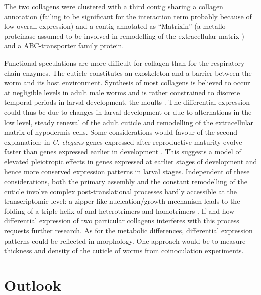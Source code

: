 \documentclass[10pt]{article}
\begin{document}
The two collagens were clustered with a third contig sharing a
collagen annotation (failing to be significant for the interaction
term probably because of low overall expression) and a contig
annotated as ``Matrixin'' (a metallo-proteinase assumed to be involved
in remodelling of the extracellular matrix \cite{mealloprot}) and a
ABC-transporter family protein.

Functional speculations are more difficult for collagen than for the
respiratory chain enzymes. The cuticle constitutes an exoskeleton and
a barrier between the worm and its host environment. Synthesis of most
collagens is believed to occur at negligible levels in adult male
worms and is rather constrained to discrete temporal periods in larval
development, the moults \cite{pmid10637627}. The differential
expression could thus be due to changes in larval development or due
to alternations in the low level, steady renewal of the adult cuticle
and remodelling of the extracellular matrix of hypodermis cells. Some
considerations would favour of the second explanation: in
\textit{C. elegans} genes expressed after reproductive maturity evolve
faster than genes expressed earlier in development
\cite{pmid15371532}. This suggests a model of elevated pleiotropic
effects in genes expressed at earlier stages of development and hence
more conserved expression patterns in larval stages. Independent of
these considerations, both the primary assembly and the constant
remodelling of the cuticle involve complex post-translational
processes hardly accessible at the transcriptomic level: a zipper-like
nucleation/growth mechanism leads to the folding of a triple helix of
and heterotrimers and homotrimers \cite{kennedy2001parasitic}. If and
how differential expression of two particular collagens interferes
with this process requests further research. As for the metabolic
differences, differential expression patterns could be reflected in
morphology. One approach would be to measure thickness and density of
the cuticle of worms from coinoculation experiments.

\section{Outlook}
\end{document}
